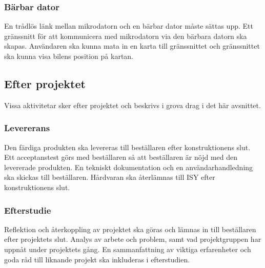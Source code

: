 \documentclass[projektplan/plan.tex]{subfiles}
\begin{document}
\subsubsection*{Bärbar dator}
En trådlös länk mellan mikrodatorn och en bärbar dator måste sättas upp. Ett
gränssnitt för att kommunicera med mikrodatorn via den bärbara datorn ska
skapas. Användaren ska kunna mata in en karta till gränssnittet och
gränssnittet ska kunna visa bilens position på kartan.

\subsection{Efter projektet}
Vissa aktivitetar sker efter projektet och beskrivs i grova drag i det här
avsnittet.

\subsubsection*{Levererans}
Den färdiga produkten ska levereras till beställaren efter konstruktionens
slut. Ett acceptanstest görs med beställaren så att beställaren är nöjd med den
levererade produkten. En tekniskt dokumentation och en användarhandledning ska
skickas till beställaren. Hårdvaran ska återlämnas till ISY efter
konstruktionens slut.

\subsubsection*{Efterstudie}
Reflektion och återkoppling av projektet ska göras och lämnas in till
beställaren efter projektets slut. Analys av arbete och problem, samt vad
projektgruppen har uppnåt under projektets gång. En sammanfattning av viktiga
erfarenheter och goda råd till liknande projekt ska inkluderas i efterstudien.
\end{document}
